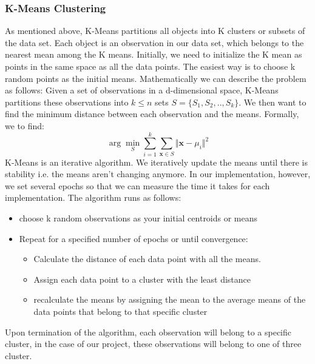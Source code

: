 \begin{multicols*}{2}
    \subsubsection{K-Means Clustering}
    As mentioned above, K-Means partitions all objects into K clusters or subsets of the data set. Each object is an observation in our data set, which belongs to the nearest mean among the K means. Initially, we need to initialize the K mean as points in the same space as all the data points. The easiest way is to choose k random points as the initial means. Mathematically we can describe the problem as follows:
    Given a set of observations in a d-dimensional space,  K-Means partitions these observations into $k\leq n$ sets $S = \{S_1, S_2 , .. ,S_k\}$. We then want to find the minimum distance between each observation and the means. Formally, we to find:
    \begin{equation}
        \arg \min_S\sum_{i = 1}^{k}\sum_{\mathbf{x}\in S} \Vert \mathbf{x} - \mu_i \Vert^2   
    \end{equation}  
    K-Means is an iterative algorithm. We iteratively update the means until there is stability i.e. the means aren't changing anymore. In our implementation, however, we set several epochs so that we can measure the time it takes for each implementation. 
    The algorithm runs as follows:
    \begin{itemize}
        \item choose k random observations as your initial centroids or means
        \item Repeat for a specified number of epochs or until convergence:
        \begin{itemize}
            \item Calculate the distance of each data point with all the means.
            \item Assign each data point to a cluster with the least distance
            \item recalculate the means by assigning the mean to the average means of the data points that belong to that specific cluster
        \end{itemize}
    \end{itemize}

    Upon termination of the algorithm, each observation will belong to a specific cluster, in the case of our project, these observations will belong to one of three cluster.


\end{multicols*}

